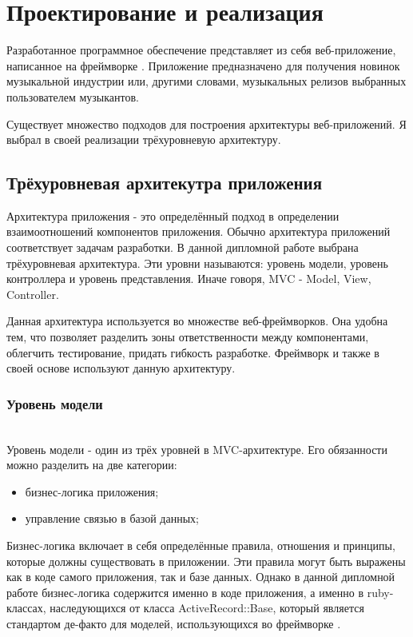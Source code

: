\section{Проектирование и реализация} %
\label{sec:arch_and_realization}


Разработанное программное обеспечение представляет из себя веб-приложение, написанное на фреймворке \ror.
Приложение предназначено для получения новинок музыкальной индустрии или, другими словами, музыкальных релизов выбранных пользователем музыкантов.

Существует множество подходов для построения архитектуры веб-приложений. Я выбрал в своей реализации трёхуровневую архитектуру.

\subsection{Трёхуровневая архитекутра приложения}
\label{sub:arch_and_mod:mvc}

Архитектура приложения - это определённый подход в определении взаимоотношений компонентов приложения. Обычно архитектура приложений соответствует задачам разработки. В данной дипломной работе выбрана трёхуровневая архитектура. Эти уровни называются: уровень модели, уровень контроллера и уровень представления. Иначе говоря, MVC - Model, View, Controller.

Данная архитектура используется во множестве веб-фреймворков. Она удобна тем, что позволяет разделить зоны ответственности между компонентами, облегчить тестирование, придать гибкость разработке. Фреймворк \ror{} и \ajs{} также в своей основе используют данную архитектуру.

\subsubsection{Уровень модели}
\label{sub:arch_and_mod:mvc:model}
~\\

Уровень модели - один из трёх уровней в MVC-архитектуре. Его обязанности можно разделить на две категории:

\begin{itemize}
  \item бизнес-логика приложения;
  \item управление связью в базой данных;
\end{itemize}

Бизнес-логика включает в себя определённые правила, отношения и принципы, которые должны существовать в приложении. Эти правила могут быть выражены как в коде самого приложения, так и базе данных. Однако в данной дипломной работе бизнес-логика содержится именно в коде приложения, а именно в ruby-классах, наследующихся от класса ActiveRecord::Base, который является стандартом де-факто для моделей, использующихся во фреймворке \ror{}.

